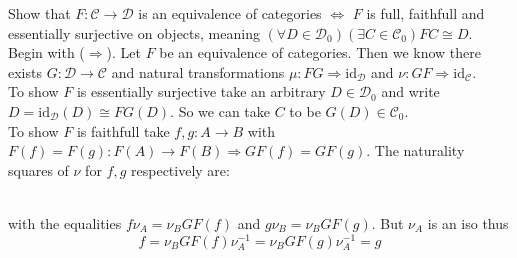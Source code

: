 \documentclass[11pt]{article}
\theoremstyle{plain}
\theoremstyle{definition}
\theoremstyle{remark}
\newcommand{\cC}{\mathcal{C}}
\newcommand{\cD}{\mathcal{D}}
\newcommand{\id}{\mathrm{id}}
\begin{document}


Show that $F:\cC \to \cD$ is an equivalence of categories $\iff$ $F$ is full, faithfull and essentially surjective on objects, meaning $(\forall D \in \cD_0 )(\exists C \in \cC_0) FC\cong D$.\\
Begin with ($\Rightarrow$). Let $F$ be an equivalence of categories. Then we know there exists $G: \cD \to \cC$ and natural transformations $\mu :FG \Rightarrow \id_{\cD}$ and $\nu:GF \Rightarrow \id_{\cC}$.\\
To show $F$ is essentially surjective take an arbitrary $D \in \cD_0$ and write $D=\id_{\cD}(D)\cong FG(D)$. So we can take $C$ to be $G(D) \in \cC_0$.\\
To show $F$ is faithfull take $f,g:A \to B$ with $F(f)=F(g): F(A)\to F(B) \Rightarrow GF(f)=GF(g)$. The naturality squares of $\nu$ for $f,g$ respectively are:

\\
with the equalities $f\nu_A=\nu_B GF(f)$ and $g \nu_B=\nu_BGF(g)$. But $\nu_A$ is an iso thus \[f=\nu_B GF(f)\nu_A^{-1}=\nu_B GF(g)\nu_A^{-1}=g\]
\end{document}
